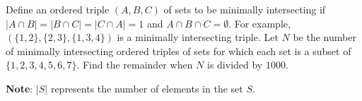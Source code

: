Define an ordered triple $ (A, B, C)$ of sets to be minimally intersecting if $ |A \cap B| = |B \cap C| = |C \cap A| = 1$ and $ A \cap B \cap C = \emptyset$. For example, $ (\{1,2\},\{2,3\},\{1,3,4\})$ is a minimally intersecting triple. Let $ N$ be the number of minimally intersecting ordered triples of sets for which each set is a subset of $ \{1,2,3,4,5,6,7\}$. Find the remainder when $ N$ is divided by $ 1000$.

\textbf{Note}: $ |S|$ represents the number of elements in the set $ S$.